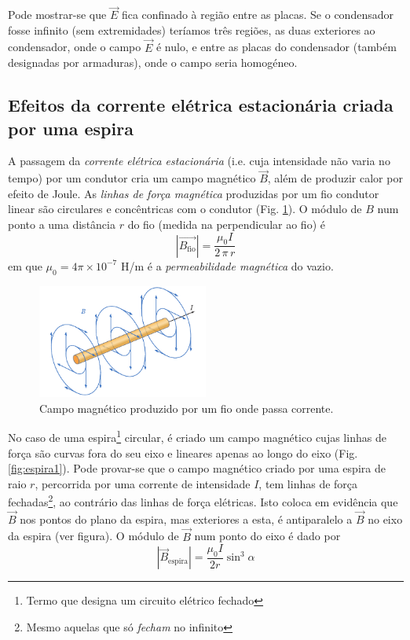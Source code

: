 \documentclass[12pt,a4paper,oneside]{paper}
\begin{document}
Pode mostrar-se que $\vec{E}$ fica confinado à região entre as placas. Se o condensador fosse infinito (sem extremidades)
teríamos três regiões, as duas exteriores ao condensador, onde o campo  $\vec{E}$  é nulo, e entre as placas do condensador
(também designadas por armaduras), onde o campo seria homogéneo.


\subsection{Efeitos da corrente elétrica estacionária criada por uma espira}
A passagem da \emph{corrente elétrica estacionária} (i.e. cuja intensidade não varia no tempo) por um condutor cria um
campo magnético $\vec{B}$, além de produzir calor por efeito de Joule. As \emph{linhas de força magnética} produzidas por
um fio condutor linear são circulares e concêntricas com o condutor (Fig. \ref{fig:condutor}). O módulo de $B$ num ponto a
uma distância $r$ do fio (medida na perpendicular ao fio) é
\begin{equation}
	|\vec{B_{\mathrm{fio}}}| = \frac{\mu_0 I}{2\, \pi \, r} 
\end{equation}
 em que $\mu_0 =  4 \pi \times  10^{-7}$ H/m é a \emph{permeabilidade magnética}  do vazio. 
 
 \begin{figure}[H]
	\centering 
	\includegraphics[width=0.5\textwidth]{thomson_images/fig-fio.pdf} 
	\caption{Campo magnético produzido por um fio onde passa corrente.}
	\label{fig:condutor}
\end{figure}

No caso de uma espira\footnote{Termo que designa um circuito elétrico fechado} circular, é criado um campo magnético
cujas linhas de força são curvas fora do seu eixo e lineares apenas ao longo do eixo (Fig. \ref{fig:espira1}). Pode provar-se
que o campo magnético criado por uma espira de raio $r$, percorrida por uma corrente de intensidade $I$, tem linhas de força
fechadas\footnote{Mesmo aquelas que só \emph{fecham} no infinito}, ao contrário das linhas de força elétricas. Isto coloca
em evidência que $\vec{B}$ nos pontos do plano da espira, mas exteriores a esta, é antiparalelo a $\vec{B}$ no eixo da espira
(ver figura). O módulo de $\vec{B}$ num ponto do eixo é dado por
\begin{equation}
	|\vec{B}_{\mathrm{espira}}| = \frac{\mu_0 I}{2 r} \sin^3 \alpha
\end{equation}
\end{document}
